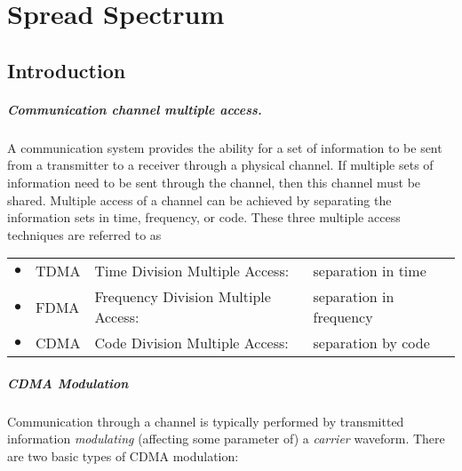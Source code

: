 
\chapter{Spread Spectrum}
\label{chp:cdma}
\section{Introduction}
\paragraph{Communication channel multiple access.}
A communication system provides the ability for 
a set of information to be 
sent from a transmitter to a receiver through a physical channel.
If multiple sets of information need to be sent through the channel,
then this channel must be shared.
Multiple access of a channel can be achieved by separating the information sets in
time, frequency, or code.  
These three multiple access techniques are referred to as

\begin{tabular}{clll}
   $\bullet$ & TDMA & Time Division Multiple Access:      & separation in time \\
   $\bullet$ & FDMA & Frequency Division Multiple Access: & separation in frequency \\
   $\bullet$ & CDMA & Code Division Multiple Access:      & separation by code 
\end{tabular}

\paragraph{CDMA Modulation}
Communication through a channel is typically performed by transmitted information 
{\em modulating} (affecting some parameter of) a {\em carrier} waveform.
There are two basic types of CDMA modulation:

